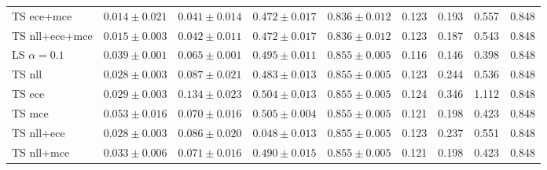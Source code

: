 \begin{table}[h!]
{\begin{tabular}{l|cccc|m{0.8cm}m{0.8cm}m{0.8cm}m{0.8cm}|}
			TS ece+mce & \multicolumn{1}{c|}{$0.014 \pm 0.021$} & \multicolumn{1}{c|}{$0.041 \pm 0.014$} & \multicolumn{1}{c|}{$0.472 \pm 0.017$} & \multicolumn{1}{c|}{$0.836 \pm 0.012$} & \multicolumn{1}{c|}{0.123} & \multicolumn{1}{c|}{0.193} & \multicolumn{1}{c|}{0.557} & \multicolumn{1}{c|}{0.848} \\
			TS nll+ece+mce & \multicolumn{1}{c|}{$0.015 \pm 0.003$} & \multicolumn{1}{c|}{$0.042 \pm 0.011$} & \multicolumn{1}{c|}{$0.472 \pm 0.017$} & \multicolumn{1}{c|}{$0.836 \pm 0.012$} & \multicolumn{1}{c|}{0.123} & \multicolumn{1}{c|}{0.187} & \multicolumn{1}{c|}{0.543} & \multicolumn{1}{c|}{0.848} \\\hline \hline
			LS $\alpha=0.1$ & \multicolumn{1}{c|}{$0.039 \pm 0.001$} & \multicolumn{1}{c|}{$0.065 \pm 0.001$} & \multicolumn{1}{c|}{$0.495 \pm 0.011$} & \multicolumn{1}{c|}{$0.855 \pm 0.005$} & \multicolumn{1}{c|}{0.116} & \multicolumn{1}{c|}{0.146} & \multicolumn{1}{c|}{0.398} & \multicolumn{1}{c|}{0.848} \\
			TS nll & \multicolumn{1}{c|}{$0.028 \pm 0.003$} & \multicolumn{1}{c|}{$0.087 \pm 0.021$} & \multicolumn{1}{c|}{$0.483 \pm 0.013$} & \multicolumn{1}{c|}{$0.855 \pm 0.005$} & \multicolumn{1}{c|}{0.123} & \multicolumn{1}{c|}{0.244} & \multicolumn{1}{c|}{0.536} & \multicolumn{1}{c|}{0.848} \\
			TS ece & \multicolumn{1}{c|}{$0.029 \pm 0.003$} & \multicolumn{1}{c|}{$0.134 \pm 0.023$} & \multicolumn{1}{c|}{$0.504 \pm 0.013$} & \multicolumn{1}{c|}{$0.855 \pm 0.005$} & \multicolumn{1}{c|}{0.124} & \multicolumn{1}{c|}{0.346} & \multicolumn{1}{c|}{1.112} & \multicolumn{1}{c|}{0.848} \\
			TS mce & \multicolumn{1}{c|}{$0.053 \pm 0.016$} & \multicolumn{1}{c|}{$0.070 \pm 0.016$} & \multicolumn{1}{c|}{$0.505 \pm 0.004$} & \multicolumn{1}{c|}{$0.855 \pm 0.005$} & \multicolumn{1}{c|}{0.121} & \multicolumn{1}{c|}{0.198} & \multicolumn{1}{c|}{0.423} & \multicolumn{1}{c|}{0.848} \\
			TS nll+ece & \multicolumn{1}{c|}{$0.028 \pm 0.003$} & \multicolumn{1}{c|}{$0.086 \pm 0.020$} & \multicolumn{1}{c|}{$0.048 \pm 0.013$} & \multicolumn{1}{c|}{$0.855 \pm 0.005$} & \multicolumn{1}{c|}{0.123} & \multicolumn{1}{c|}{0.237} & \multicolumn{1}{c|}{0.551} & \multicolumn{1}{c|}{0.848} \\
			TS nll+mce & \multicolumn{1}{c|}{$0.033 \pm 0.006$} & \multicolumn{1}{c|}{$0.071 \pm 0.016$} & \multicolumn{1}{c|}{$0.490 \pm 0.015$} & \multicolumn{1}{c|}{$0.855 \pm 0.005$} & \multicolumn{1}{c|}{0.121} & \multicolumn{1}{c|}{0.198} & \multicolumn{1}{c|}{0.423} & \multicolumn{1}{c|}{0.848} \\

\end{tabular}}
\end{table}
